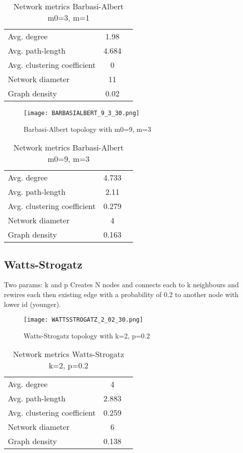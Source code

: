 \documentclass[Bachelorarbeit.tex]{subfiles}
\begin{document}
\begin{table}[h]
	\centering
	\caption{Network metrics Barbasi-Albert m0=3, m=1}
	\begin{tabular} { l c r }
		\hline
		Avg. degree & 1.98 \\
		Avg. path-length & 4.684 \\
		Avg. clustering coefficient & 0 \\
		Network diameter & 11 \\
		Graph density & 0.02 \\
		\hline
	\end{tabular}
\end{table}

\begin{figure}[H]
	\centering
  \texttt{[image: BARBASIALBERT\_9\_3\_30.png]}
	\caption{Barbasi-Albert topology with m0=9, m=3}
	\label{fig:topology_BARBASIALBERT_9_3_30}
\end{figure}

\begin{table}[h]
	\centering
	\caption{Network metrics Barbasi-Albert m0=9, m=3}
	\begin{tabular} { l c r }
		\hline
		Avg. degree & 4.733 \\
		Avg. path-length & 2.11 \\
		Avg. clustering coefficient & 0.279 \\
		Network diameter & 4 \\
		Graph density & 0.163 \\
		\hline
	\end{tabular}
\end{table}

\subsection{Watts-Strogatz}

Two params: k and p
Creates N nodes and connects each to k neighbours and rewires each then existing edge with a probability of 0.2 to another node with lower id (younger).

\begin{figure}[H]
	\centering
  \texttt{[image: WATTSSTROGATZ\_2\_02\_30.png]}
	\caption{Watts-Strogatz topology with k=2, p=0.2}
	\label{fig:topology_WATTSSTROGATZ_2_02_30}
\end{figure}

\begin{table}[h]
	\centering
	\caption{Network metrics Watts-Strogatz k=2, p=0.2}
	\begin{tabular} { l c r }
		\hline
		Avg. degree & 4 \\
		Avg. path-length & 2.883 \\
		Avg. clustering coefficient & 0.259 \\
		Network diameter & 6 \\
		Graph density & 0.138 \\
		\hline
	\end{tabular}
\end{table}
\end{document}
